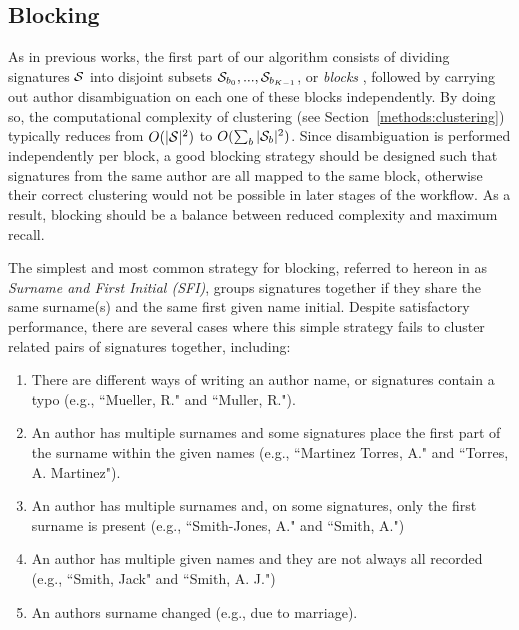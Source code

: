 \documentclass[runningheads,a4paper]{llncs}
\makeatletter
\newcommand*{\eg}{e.g.\@\xspace}
\makeatother
\begin{document}
\subsection{Blocking}
\label{methods:blocking}

As in previous works, the first part of our algorithm consists of dividing
signatures ${\cal S}$ into disjoint subsets ${\cal S}_{b_0}, ..., {\cal
S}_{b_{K-1}}$, or \textit{blocks} \cite{fellegi69}, followed by carrying out
author disambiguation on each one of these blocks independently.
By doing so, the computational complexity of clustering (see Section~\ref{methods:clustering})
typically reduces from $O(|{\cal S}|^2)$ to $O(\sum_b |{\cal S}_b|^2)$.
Since disambiguation is performed independently per block, a good blocking strategy should be
designed such that signatures from the same author are all mapped to the same
block, otherwise their correct clustering would not be possible in later stages of the workflow.
As a result, blocking should be a balance between reduced complexity and maximum recall.

The simplest and most common strategy for blocking, referred to hereon in as \textit{Surname and First Initial (SFI)},
groups signatures together if they share the same surname(s) and the same first
given name initial.
Despite satisfactory performance, there are several cases where this simple strategy fails to cluster related pairs of signatures together, including:

\begin{enumerate}
  \item There are different
  ways of writing an author name, or signatures contain a typo
  (\eg, ``Mueller, R." and ``Muller, R.").

  \item An author has multiple surnames and some signatures place the first part of the surname within the given names (\eg, ``Martinez Torres, A." and ``Torres, A. Martinez").

  \item An author has multiple surnames and, on some signatures, only the first surname is
  present (\eg, ``Smith-Jones, A." and ``Smith, A.")

  \item An author has multiple given names and they are not always all recorded (\eg,
  ``Smith, Jack" and ``Smith, A. J.")

  \item An authors surname changed (\eg, due to marriage).
\end{enumerate}
\end{document}

